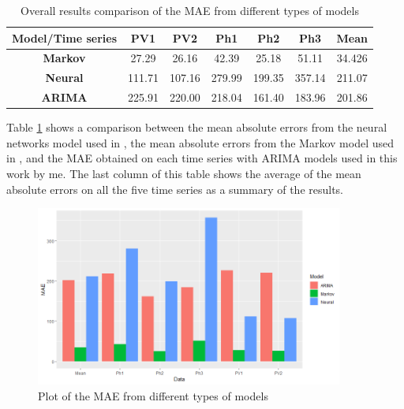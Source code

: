 \documentclass[12pt,a4paper,titlepage]{report}
\begin{document}
\begin{table}[htbp]
    \begin{tabular}{|c|c|c|c|c|c|c|}
        \hline
        \textbf{Model/Time series} & \textbf{PV1} & \textbf{PV2} & \textbf{Ph1} & \textbf{Ph2} & \textbf{Ph3} & \textbf{Mean} \\ \hline
        \textbf{Markov}            & 27.29        & 26.16        & 42.39        & 25.18        & 51.11        & 34.426        \\ \hline
        \textbf{Neural}            & 111.71       & 107.16       & 279.99       & 199.35       & 357.14       & 211.07        \\ \hline
        \textbf{ARIMA}             & 225.91       & 220.00       & 218.04       & 161.40       & 183.96       & 201.86        \\ \hline
    \end{tabular}
    
    \centering
    \caption{Overall results comparison of the MAE from different types of models}
    \label{overallcomparisonMAE}
\end{table}

Table \ref{overallcomparisonMAE} shows a comparison between the mean absolute errors from the neural networks model used in \cite{feilmeier}, the mean absolute errors from the Markov model used in \cite{gellertmarkov}, \cite{antonescu} and the MAE obtained on each time series with ARIMA models used in this work by me.
The last column of this table shows the average of the mean absolute errors on all the five time series as a summary of the results.

%
\begin{figure}[htbp]
    \centering
    \includegraphics[width=0.9\textwidth]{doverallcomparisonplot}
    \caption{Plot of the MAE from different types of models}
    \label{doverallcomparisonplot}
\end{figure}
\end{document}

